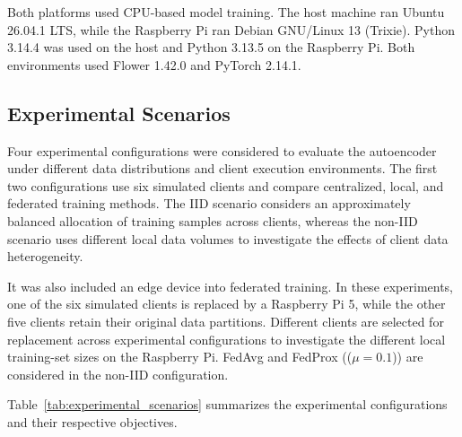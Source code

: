 \documentclass[12pt]{article}
\begin{document}
Both platforms used CPU-based model training. The host machine ran Ubuntu 26.04.1 LTS, while the Raspberry Pi ran Debian GNU/Linux 13 (Trixie). Python 3.14.4 was used on the host and Python 3.13.5 on the Raspberry Pi. Both environments used Flower 1.42.0 and PyTorch 2.14.1. 

\subsection{Experimental Scenarios}
	

Four experimental configurations were considered to evaluate the autoencoder under different data distributions and client execution environments. The first two configurations use six simulated clients and compare centralized, local, and federated training methods. The IID scenario considers an approximately balanced allocation of training samples across clients, whereas the non-IID scenario uses different local data volumes to investigate the effects of client data heterogeneity.

It was also included an edge device into federated training. In these experiments, one of the six simulated clients is replaced by a Raspberry Pi 5, while the other five clients retain their original data partitions. Different clients are selected for replacement across experimental configurations to investigate the different local training-set sizes on the Raspberry Pi. FedAvg and FedProx (($\mu=0.1$)) are considered in the non-IID configuration.

Table~\ref{tab:experimental_scenarios} summarizes the experimental configurations and their respective objectives.
\end{document}
